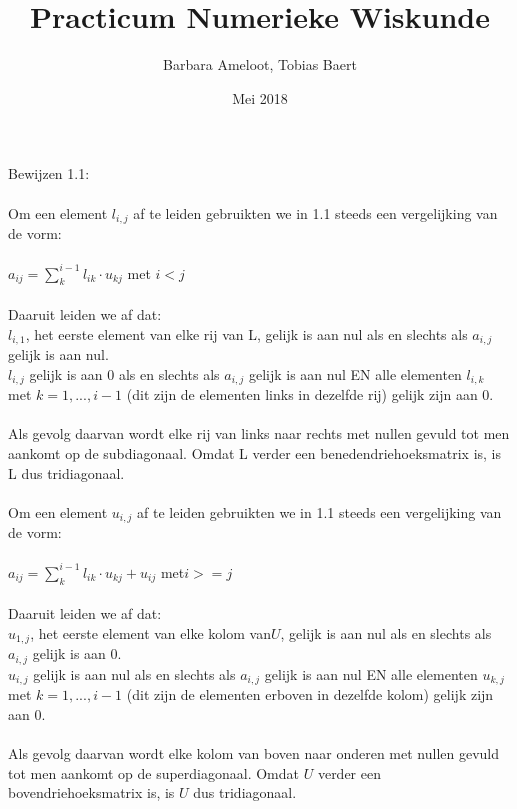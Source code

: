 \documentclass[a4paper]{article}
\title{Practicum Numerieke Wiskunde}
\author{Barbara Ameloot, Tobias Baert}
\date{Mei 2018}
\begin{document}
\maketitle
Bewijzen 1.1:
\\{}
\\Om een element  $l_{i,j}$ af te leiden gebruikten we in 1.1 steeds een vergelijking van de vorm:
\\{}
\\$a_{ij} = \sum_k^{i-1} {l_{ik}\cdot u_{kj}}$ met $ i < j$ 
\\{}
\\Daaruit leiden we af dat:
\\ \textbullet{ } $l_{i,1}$, het eerste element van elke rij van L, gelijk is aan nul als en slechts als $a_{i,j}$ gelijk is aan nul.
\\ \textbullet { } $ l_{i,j}$ gelijk is aan 0 als en slechts als $a_{i,j}$ gelijk is aan nul EN alle elementen $l_{i,k}$ met $k = 1, ..., i - 1$ (dit zijn de elementen links in dezelfde rij) gelijk zijn aan 0.
\\{}
\\Als gevolg daarvan wordt elke rij van links naar rechts met nullen gevuld tot men aankomt op de subdiagonaal. Omdat L verder een benedendriehoeksmatrix is, is L dus tridiagonaal.
\\{}
\\Om een element $u_{i,j}$ af te leiden gebruikten we in 1.1 steeds een vergelijking van de vorm:
\\{}
\\$a_{ij} = \sum_k^{i-1} {l_{ik}\cdot u_{kj}} + u_{ij}$ met$ i >= j $
\\{}
\\Daaruit leiden we af dat:
\\ \textbullet{ } $u_{1,j}$, het eerste element van elke kolom van$ U$, gelijk is aan nul als en slechts als $a_{i,j}$ gelijk is aan 0.
\\ \textbullet{ } $u_{i,j}$ gelijk is aan nul als en slechts als $a_{i,j}$ gelijk is aan nul EN alle elementen $u_{k,j}$ met $k = 1, ..., i - 1$ (dit zijn de elementen erboven in dezelfde kolom) gelijk zijn aan 0.
\\{}
\\Als gevolg daarvan wordt elke kolom van boven naar onderen met nullen gevuld tot men aankomt op de superdiagonaal. Omdat $U$ verder een bovendriehoeksmatrix is, is $U$ dus tridiagonaal.
\end{document}
